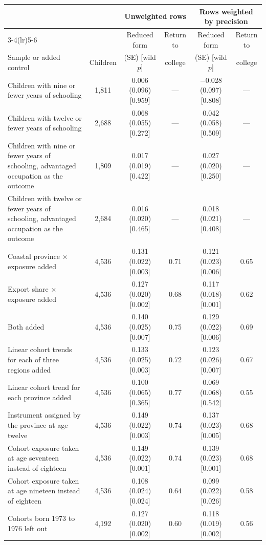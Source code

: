 \begin{tabular}{@{}p{4.6cm}ccccc@{}}
\toprule
 & & \multicolumn{2}{c}{Unweighted rows} & \multicolumn{2}{c}{Rows weighted by precision} \\
\cmidrule(lr){3-4}\cmidrule(lr){5-6}
 & & Reduced form & Return to & Reduced form & Return to \\
Sample or added control & Children & (SE) [wild $p$] & college & (SE) [wild $p$] & college \\
\midrule
Children with nine or fewer years of schooling & 1,811 & 0.006 (0.096) [0.959] & --- & $-$0.028 (0.097) [0.808] & --- \\
Children with twelve or fewer years of schooling & 2,688 & 0.068 (0.055) [0.272] & --- & 0.042 (0.058) [0.509] & --- \\
Children with nine or fewer years of schooling, advantaged occupation as the outcome & 1,809 & 0.017 (0.019) [0.422] & --- & 0.027 (0.020) [0.250] & --- \\
Children with twelve or fewer years of schooling, advantaged occupation as the outcome & 2,684 & 0.016 (0.020) [0.465] & --- & 0.018 (0.021) [0.408] & --- \\
Coastal province $\times$ exposure added & 4,536 & 0.131 (0.022) [0.003] & 0.71 & 0.121 (0.023) [0.006] & 0.65 \\
Export share $\times$ exposure added & 4,536 & 0.127 (0.020) [0.002] & 0.68 & 0.117 (0.018) [0.001] & 0.62 \\
Both added & 4,536 & 0.140 (0.025) [0.007] & 0.75 & 0.129 (0.022) [0.006] & 0.69 \\
Linear cohort trends for each of three regions added & 4,536 & 0.133 (0.025) [0.003] & 0.72 & 0.123 (0.026) [0.007] & 0.67 \\
Linear cohort trend for each province added & 4,536 & 0.100 (0.065) [0.365] & 0.77 & 0.069 (0.068) [0.542] & 0.55 \\
Instrument assigned by the province at age twelve & 4,536 & 0.149 (0.022) [0.003] & 0.74 & 0.137 (0.023) [0.005] & 0.68 \\
Cohort exposure taken at age seventeen instead of eighteen & 4,536 & 0.149 (0.022) [0.001] & 0.74 & 0.139 (0.023) [0.001] & 0.68 \\
Cohort exposure taken at age nineteen instead of eighteen & 4,536 & 0.108 (0.024) [0.024] & 0.64 & 0.099 (0.022) [0.026] & 0.58 \\
Cohorts born 1973 to 1976 left out & 4,192 & 0.127 (0.020) [0.002] & 0.60 & 0.118 (0.019) [0.002] & 0.56 \\
\bottomrule
\end{tabular}
